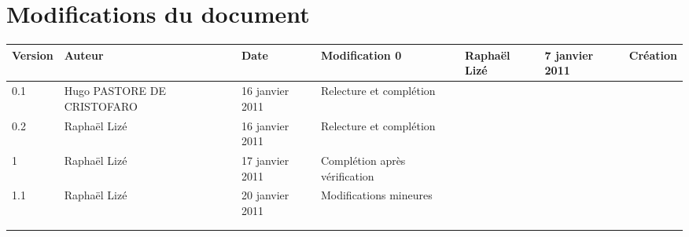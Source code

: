 
\section*{Modifications du document}

\begin{center}
\begin{longtable}{|m{14mm}||m{36mm}|m{36mm}|m{60mm}|}
\hline
Version & Auteur & Date & Modification\endhead \hline
0
& %
Raphaël Lizé
& %
7 janvier 2011
& %
Création
\\\hline
0.1
& %
Hugo PASTORE DE CRISTOFARO
& %
16 janvier 2011
& %
Relecture et complétion
\\\hline
0.2
& %
Raphaël Lizé
& %
16 janvier 2011
& %
Relecture et complétion
\\\hline
1
& %
Raphaël Lizé
& %
17 janvier 2011
& %
Complétion après vérification
\\\hline
1.1
& %
Raphaël Lizé
& %
20 janvier 2011
& %
Modifications mineures
\\\hline

& %

& %

& %

\\\hline

& %

& %

& %

\\\hline
\end{longtable}
\end{center}

